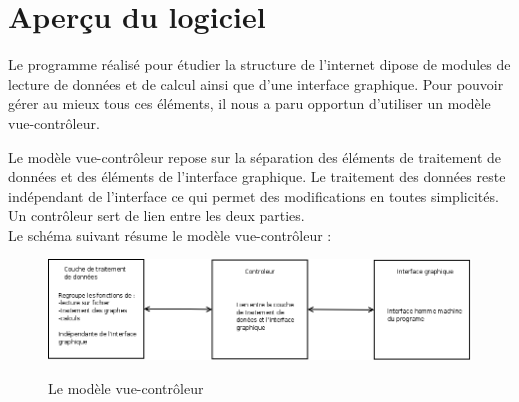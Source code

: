 \documentclass[a4paper,12pt]{article}
\title{}
\author{}
\begin{document}
\section{Aper\c cu du logiciel}

\par
Le programme r\'ealis\'e pour \'etudier la structure de l'internet dipose de modules de lecture de donn\'ees et de calcul ainsi que d'une interface graphique. Pour pouvoir g\'erer au mieux tous ces \'el\'ements, il nous a paru opportun d'utiliser un mod\`ele vue-contr\^oleur.
\par
Le mod\`ele vue-contr\^oleur repose sur la s\'eparation des \'el\'ements de traitement de donn\'ees et des \'el\'ements de l'interface graphique. Le traitement des donn\'ees reste ind\'ependant de l'interface ce qui permet des modifications en toutes simplicit\'es. Un contr\^oleur sert de lien entre les deux parties. \\
Le sch\'ema suivant r\'esume le mod\`ele vue-contr\^oleur :

\begin{figure}[ht]
\centering
 \fbox
 {
 \includegraphics[width=16cm]{./schema/modele_mvc.png}
 }
  \caption{\label{mvc}Le mod\`ele vue-contr\^oleur}
\end{figure}
\end{document}
